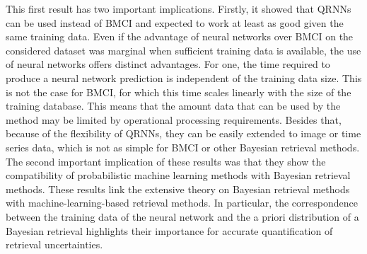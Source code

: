 This first result has two important implications. Firstly, it showed that QRNNs
can be used instead of BMCI and expected to work at least as good given the same
training data. Even if the advantage of neural networks over BMCI on the
considered dataset was marginal when sufficient training data is available, the
use of neural networks offers distinct advantages. For one, the time required to
produce a neural network prediction is independent of the training data size.
This is not the case for BMCI, for which this time scales linearly with the size
of the training database. This means that the amount data that can be used by
the method may be limited by operational processing requirements. Besides that,
because of the flexibility of QRNNs, they can be easily extended to image or
time series data, which is not as simple for BMCI or other Bayesian retrieval
methods. The second important implication of these results was that they show
the compatibility of probabilistic machine learning methods with Bayesian
retrieval methods. These results link the extensive theory on Bayesian retrieval
methods \citep{rodgers00, tarantola05} with machine-learning-based retrieval
methods. In particular, the correspondence between the training data of the
neural network and the a priori distribution of a Bayesian retrieval highlights
their importance for accurate quantification of retrieval uncertainties.


